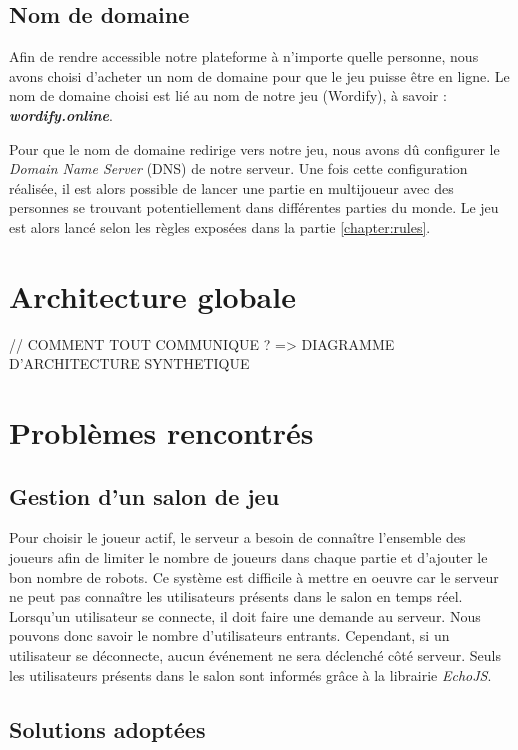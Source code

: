 \documentclass{tnreport}
\begin{document}
\subsection{Nom de domaine}

Afin de rendre accessible notre plateforme à n'importe quelle personne, nous avons choisi d'acheter un nom de domaine pour que le jeu puisse être en ligne. Le nom de domaine choisi est lié au nom de notre jeu (Wordify), à savoir : \textbf{\textit{wordify.online}}.

Pour que le nom de domaine redirige vers notre jeu, nous avons dû configurer le \textit{Domain Name Server} (DNS) de notre serveur. Une fois cette configuration réalisée, il est alors possible de lancer une partie en multijoueur avec des personnes se trouvant potentiellement dans différentes parties du monde. Le jeu est alors lancé selon les règles exposées dans la partie \ref{chapter:rules}. 

\section{Architecture globale}

\label{chapter:global_architecture}

// COMMENT TOUT COMMUNIQUE ? => DIAGRAMME D'ARCHITECTURE SYNTHETIQUE

\section{Problèmes rencontrés}

\subsection{Gestion d'un salon de jeu}

Pour choisir le joueur actif, le serveur a besoin de connaître l'ensemble des joueurs afin de limiter le nombre de joueurs dans chaque partie et d'ajouter le bon nombre de robots. Ce système est difficile à mettre en oeuvre car le serveur ne peut pas connaître les utilisateurs présents dans le salon en temps réel. Lorsqu'un utilisateur se connecte, il doit faire une demande au serveur. Nous pouvons donc savoir le nombre d'utilisateurs entrants. Cependant, si un utilisateur se déconnecte, aucun événement ne sera déclenché côté serveur. Seuls les utilisateurs présents dans le salon sont informés grâce à la librairie \textit{EchoJS}.

\subsection{Solutions adoptées}
\end{document}
